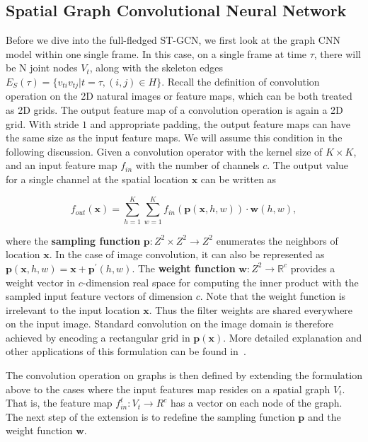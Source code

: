 \documentclass[letterpaper]{article} %
\begin{document}
\subsection{Spatial Graph Convolutional Neural Network}
Before we dive into the full-fledged ST-GCN, we first look at the graph CNN model within one single frame.
In this case, on a single frame at time $ \tau $, there will be N joint nodes $ V_t $, along with the skeleton edges $ E_S(\tau) = \{v_{ti}v_{tj}| t= \tau, (i, j) \in H\} $.
Recall the definition of convolution operation on the 2D natural images or feature maps, which can be both treated as 2D grids.
The output feature map of a convolution operation is again a 2D grid.
With stride $ 1 $ and appropriate padding, the output feature maps can have the same size as the input feature maps.
We will assume this condition in the following discussion.
Given a convolution operator with the kernel size of $ K\times K $, and an input feature map $ f_{in} $ with the number of channels $ c $.
The output value for a single channel at the spatial location $ \mathbf{x} $ can be written as

\begin{equation}\label{eq:gen_conv}
f_{out}(\mathbf{x}) = \sum_{h=1}^{K} \sum_{w=1}^{K} f_{in}(\mathbf{p}(\mathbf{x}, h, w))\cdot \mathbf{w}(h, w),
\end{equation}

where the \textbf{sampling function} $ \mathbf{p}: Z^2\times Z^2\rightarrow Z^2 $ enumerates the neighbors of location $ \mathbf{x} $.
In the case of image convolution, it can also be represented as $ \mathbf{p}(\mathbf{x}, h, w) = \mathbf{x} + \mathbf{p^\prime}(h, w). $
The \textbf{weight function} $ \mathbf{w}: Z^2\rightarrow \mathbb{R}^c$ provides a weight vector in $ c $-dimension real space for computing the inner product with the sampled input feature vectors of dimension $ c $.
Note that the weight function is irrelevant to the input location $ \mathbf{x} $.
Thus the filter weights are shared everywhere on the input image.
Standard convolution on the image domain is therefore achieved by encoding a rectangular grid in $ \mathbf{p}(\mathbf{x}) $.
More detailed explanation and other applications of this formulation can be found in~\cite{Dai2017Arxiv}.

The convolution operation on graphs is then defined by extending the formulation above to the cases where the input features map resides on a spatial graph $ V_t $.
That is, the feature map $ f_{in}^t : V_t\rightarrow R^c$ has a vector on each node of the graph.
The next step of the extension is to redefine the sampling function $ \mathbf{p} $ and the weight function $ \mathbf{w} $.
\end{document}
